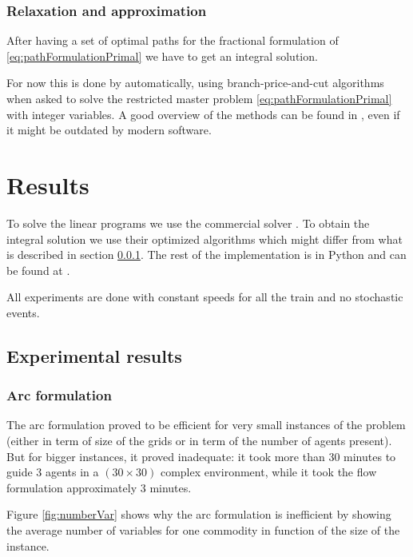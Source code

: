 \documentclass[14pt,a4paper]{article}
\theoremstyle{definition}
\numberwithin{equation}{subsection}
\begin{document}
\subsubsection{Relaxation and approximation}
\label{relaxation}

After having a set of optimal paths for the fractional formulation of \eqref{eq:pathFormulationPrimal} we have to get an integral solution.

For now this is done by \cite{gurobi} automatically, using branch-price-and-cut algorithms when asked to solve the restricted master problem \eqref{eq:pathFormulationPrimal} with integer variables. A good overview of the methods can be found in \cite{BranchAndCut}, even if it might be outdated by modern software.





\newpage
\section{Results}

To solve the linear programs we use the commercial solver \cite{gurobi}. To obtain the integral solution we use their optimized algorithms which might differ from what is described in section \ref{relaxation}. The rest of the implementation is in Python and can be found at \cite{GIT}.


All experiments are done with constant speeds for all the train and no stochastic events.

\label{results}
\subsection{Experimental results}
\label{results:arcsVSflow}

\subsubsection{Arc formulation}

The arc formulation proved to be efficient for very small instances of the problem (either in term of size of the grids or in term of the number of agents present). But for bigger instances, it proved inadequate: it took more than 30 minutes to guide 3 agents in a  $(30 \times 30)$ complex environment, while it took the flow formulation approximately 3 minutes.

Figure \ref{fig:numberVar} shows why the arc formulation is inefficient by showing the average number of variables for one commodity in function of the size of the instance.
\end{document}
